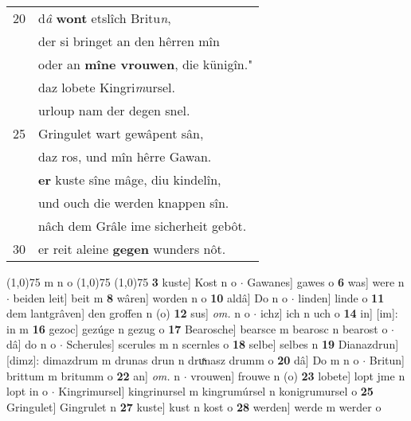 \documentclass[8pt,a4paper,notitlepage]{article}
\begin{document}
\begin{table}[ht]
\begin{minipage}[t]{0.5\linewidth}
\begin{tabular}{rl}
20 & d\textit{â} \textbf{wont} etslîch Britu\textit{n},\\ 
 & der si bringet an den hêrren mîn\\ 
 & oder an \textbf{mîne vrouwen}, die künigîn."\\ 
 & daz lobete Kingri\textit{m}ursel.\\ 
 & urloup nam der degen snel.\\ 
25 & Gringulet wart gewâpent sân,\\ 
 & daz ros, und mîn hêrre Gawan.\\ 
 & \textbf{er} kuste sîne mâge, diu kindelîn,\\ 
 & und ouch die werden knappen sîn.\\ 
 & nâch dem Grâle ime sicherheit gebôt.\\ 
30 & er reit aleine \textbf{gegen} wunders nôt.\\ 
\end{tabular}
\scriptsize
\line(1,0){75} \newline
m n o \newline
\line(1,0){75} \newline
\newline
\line(1,0){75} \newline
\textbf{3} kuste] Kost n o  $\cdot$ Gawanes] gawes o \textbf{6} was] were n  $\cdot$ beiden leit] beit m \textbf{8} wâren] worden n o \textbf{10} aldâ] Do n o  $\cdot$ linden] linde o \textbf{11} dem lantgrâven] den groffen n (o) \textbf{12} sus] \textit{om.} n o  $\cdot$ ichz] ich n uch o \textbf{14} in] [im]: in m \textbf{16} gezoc] gezúge n gezug o \textbf{17} Bearosche] bearsce m bearosc n bearost o  $\cdot$ dâ] do n o  $\cdot$ Scherules] scerules m n scernles o \textbf{18} selbe] selbes n \textbf{19} Dianazdrun] [dimz]: dimazdrum m drunas drun n druͯnasz drumm o \textbf{20} dâ] Do m n o  $\cdot$ Britun] brittum m britumm o \textbf{22} an] \textit{om.} n  $\cdot$ vrouwen] frouwe n (o) \textbf{23} lobete] lopt jme n lopt in o  $\cdot$ Kingrimursel] kingrinursel m kingrumúrsel n konigrumursel o \textbf{25} Gringulet] Gingrulet n \textbf{27} kuste] kust n kost o \textbf{28} werden] werde m werder o \newline
\end{minipage}
\end{table}
\newpage
\end{document}
